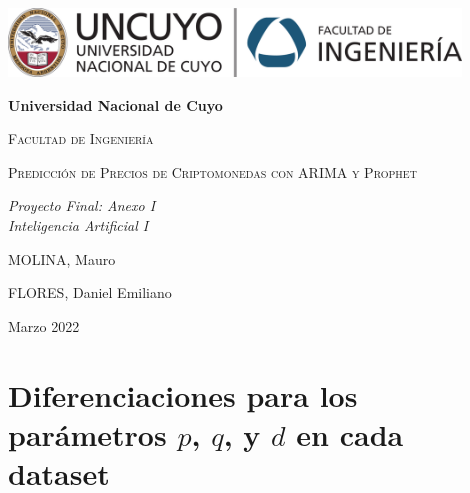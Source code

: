 \documentclass[a4paper,10pt]{article}
\begin{document}
\begin{titlepage}
\centering
{\includegraphics[width=0.9\textwidth]{fing_uncuyo}\par}
\vspace{1cm}
{\bfseries\LARGE Universidad Nacional de Cuyo \par}
\vspace{1cm}
{\scshape\Large Facultad de Ingeniería \par}
\vspace{3cm}
{\scshape\Huge Predicción de Precios de Criptomonedas con ARIMA y Prophet \par}
\vspace{3cm}
{\itshape\Large Proyecto Final: Anexo I\\Inteligencia Artificial I \par}
\vfill
{\Large MOLINA, Mauro \par}
{\Large FLORES, Daniel Emiliano \par}
\vfill
{\Large Marzo 2022 \par}
\end{titlepage}

\newpage
\section{Diferenciaciones para los parámetros $p$, $q$, y $d$ en cada dataset}
\end{document}
